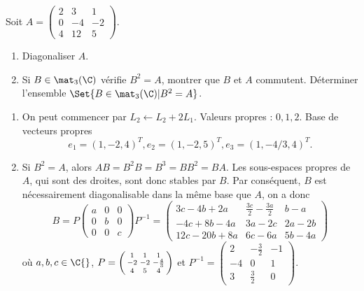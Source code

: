\begin{enonce}
\begin{exercise}[ID={RMS121/2 E1076, CCP PSI},subtitle={},tags={mpsi}, difficulty={0}]
Soit $A=\begin{pmatrix} 2&3&1\\ 0&-4&-2\\ 4&12&5\end{pmatrix}$.
\begin{enumerate}
    \item Diagonaliser $A$.
    \item Si $B\in\mat_3(\C)$ vérifie $B^2=A$, montrer que $B$ et $A$ commutent.
      Déterminer l'ensemble $\Set{B\in\mat_3(\C)| B^2=A}$.
\end{enumerate}
\end{exercise}
\begin{solution}
\begin{enumerate}
\item On peut commencer par $L_2 \gets L_2 + 2L_1$.
  Valeurs propres : $0,1,2$. Base de vecteurs propres
\begin{equation*}
    e_1=(1,-2,4)^T,
    e_2=(1,-2,5)^T,
    e_3=(1,-4/3,4)^T.
\end{equation*}

\item Si $B^2=A$, alors $AB=B^2B=B^3=BB^2=BA$.
Les sous-espaces propres de $A$, qui sont des droites, sont donc stables par $B$.
Par conséquent, $B$ est nécessairement diagonalisable dans la même base  que $A$, on a donc 
\begin{equation*}
B=
P
\begin{pmatrix}
a&0&0\\
0&b&0\\
0&0&c
\end{pmatrix}
P^{-1}
=
\begin{pmatrix}
    3c-4 b+2 a & \frac{3 c}{2}-\frac{3 a}{2} & b-a\\
    -4 c+8 b-4 a & 3 a-2 c & 2 a-2 b\\
    12 c-20 b+8 a & 6 c-6 a & 5 b-4 a
\end{pmatrix}
\end{equation*}
 où $a,b,c\in\C{}$,
 $P=
 \left(\begin{smallmatrix}
1 & 1 & 1\cr -2 & -2 & -\frac{4}{3}\cr 4 & 5 & 4
 \end{smallmatrix}\right)$
 et
$P^{-1}=
\left(\begin{smallmatrix}
2 & -\frac{3}{2} & -1\\
-4 & 0 & 1\\
3 & \frac{3}{2} & 0
\end{smallmatrix}\right)
$.
\end{enumerate}
\end{solution}
\end{enonce}
